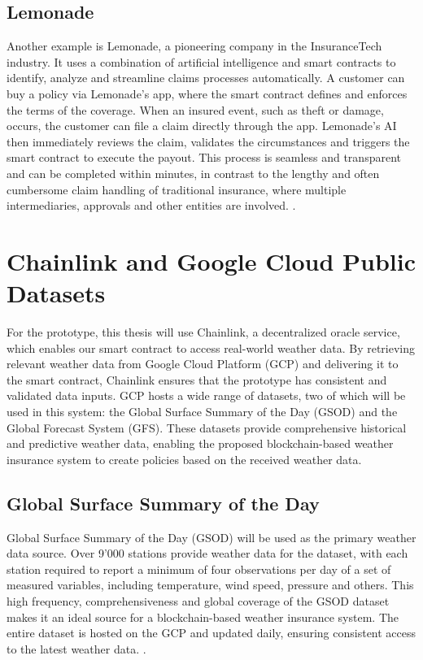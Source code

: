 \subsection{Lemonade}
Another example is Lemonade, a pioneering company in the InsuranceTech industry. It uses a combination of artificial intelligence and smart contracts to identify, analyze and streamline claims processes automatically. A customer can buy a policy via Lemonade's app, where the smart contract defines and enforces the terms of the coverage. When an insured event, such as theft or damage, occurs, the customer can file a claim directly through the app. Lemonade's AI then immediately reviews the claim, validates the circumstances and triggers the smart contract to execute the payout. This process is seamless and transparent and can be completed within minutes, in contrast to the lengthy and often cumbersome claim handling of traditional insurance, where multiple intermediaries, approvals and other entities are involved. \autocites{la2023insurtech}{tardieu2020case}.
 
\section{Chainlink and Google Cloud Public Datasets}\label{section:chainlink_google_cloud_datasets}
For the prototype, this thesis will use Chainlink, a decentralized oracle service, which enables our smart contract to access real-world weather data. By retrieving relevant weather data from Google Cloud Platform (GCP) and delivering it to the smart contract, Chainlink ensures that the prototype has consistent and validated data inputs. GCP hosts a wide range of datasets, two of which will be used in this system: the Global Surface Summary of the Day (GSOD) and the Global Forecast System (GFS). These datasets provide comprehensive historical and predictive weather data, enabling the proposed blockchain-based weather insurance system to create policies based on the received weather data.

\subsection{Global Surface Summary of the Day}\label{GSOD}
Global Surface Summary of the Day (GSOD) will be used as the primary weather data source. Over 9'000 stations provide weather data for the dataset, with each station required to report a minimum of four observations per day of a set of measured variables, including temperature, wind speed, pressure and others. This high frequency, comprehensiveness and global coverage of the GSOD dataset makes it an ideal source for a blockchain-based weather insurance system. The entire dataset is hosted on the GCP and updated daily, ensuring consistent access to the latest weather data. \autocite{NOAA_GSOD_2023}.

